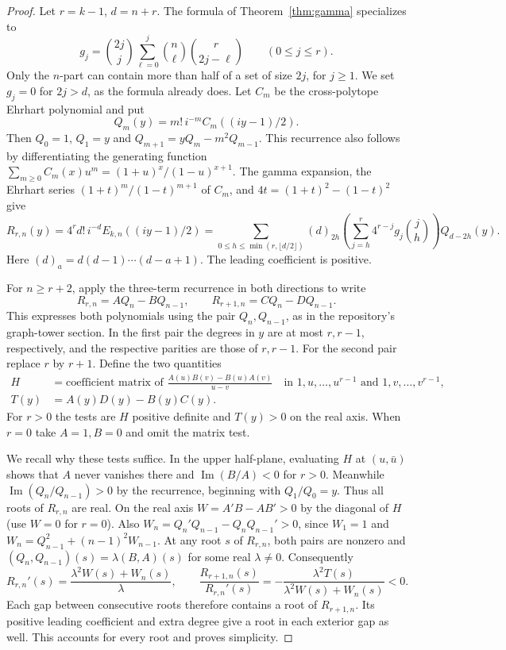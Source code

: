 \begin{proof}
Let $r=k-1$, $d=n+r$. The formula of Theorem~\ref{thm:gamma}
specializes to
\[
 g_j=\binom{2j}{j}\sum_{\ell=0}^j
           \binom n\ell\binom r{2j-\ell}\qquad (0\le j\le r).
\]
Only the $n$-part can contain more than half of a set of size $2j$,
for $j\ge1$. We set $g_j=0$ for $2j>d$, as the formula already does.
Let $C_m$ be the cross-polytope Ehrhart polynomial and put
\[
 Q_m(y)=m!\,i^{-m}C_m((iy-1)/2).
\]
Then $Q_0=1$, $Q_1=y$ and
$Q_{m+1}=yQ_m-m^2Q_{m-1}$. This recurrence also follows by
differentiating the generating function
$\sum_{m\ge0}C_m(x)u^m=(1+u)^x/(1-u)^{x+1}$.
The gamma expansion, the Ehrhart series
$(1+t)^m/(1-t)^{m+1}$ of $C_m$, and
$4t=(1+t)^2-(1-t)^2$ give
\[
 R_{r,n}(y)=4^r d!\,i^{-d}E_{k,n}((iy-1)/2)
       =\sum_{0\le h\le\min(r,\lfloor d/2\rfloor)}
           (d)_{2h}\left(\sum_{j=h}^r 4^{r-j}g_j\binom jh\right)Q_{d-2h}(y).
\]
Here $(d)_a=d(d-1)\cdots(d-a+1)$. The leading coefficient is positive.

For $n\ge r+2$, apply the three-term recurrence in both directions to
write
\[
 R_{r,n}=A Q_n-B Q_{n-1},\qquad R_{r+1,n}=C Q_n-D Q_{n-1}.
\]
This expresses both polynomials using the pair $Q_n,Q_{n-1}$, as in the
repository's graph-tower section. In the first pair the degrees in $y$ are
at most $r,r-1$, respectively, and the respective parities are those of
$r,r-1$. For the second pair replace $r$ by $r+1$.
Define the two quantities
\begin{align*}
 H&=\text{coefficient matrix of }
      \frac{A(u)B(v)-B(u)A(v)}{u-v}
      \quad\text{in }1,u,\ldots,u^{r-1}\text{ and }1,v,\ldots,v^{r-1},\\
 T(y)&=A(y)D(y)-B(y)C(y).
\end{align*}
For $r>0$ the tests are $H$ positive definite and $T(y)>0$ on the real
axis. When $r=0$ take $A=1,B=0$ and omit the matrix test.

We recall why these tests suffice. In the upper half-plane, evaluating
$H$ at $(u,\bar u)$ shows that $A$ never vanishes there and
$\operatorname{Im}(B/A)<0$ for $r>0$. Meanwhile
$\operatorname{Im}(Q_n/Q_{n-1})>0$ by the recurrence, beginning with
$Q_1/Q_0=y$. Thus all roots of $R_{r,n}$ are real. On the real axis
$W=A'B-AB'>0$ by the diagonal of $H$ (use $W=0$ for $r=0$).
Also $W_n=Q_n'Q_{n-1}-Q_nQ_{n-1}'>0$, since
$W_1=1$ and $W_n=Q_{n-1}^2+(n-1)^2W_{n-1}$.
At any root $s$ of $R_{r,n}$, both pairs are nonzero and
$(Q_n,Q_{n-1})(s)=\lambda (B,A)(s)$ for some real $\lambda\ne0$.
Consequently
\[
 R_{r,n}'(s)=\frac{\lambda^2 W(s)+W_n(s)}{\lambda},\qquad
 \frac{R_{r+1,n}(s)}{R_{r,n}'(s)}
   =-\frac{\lambda^2 T(s)}{\lambda^2 W(s)+W_n(s)}<0.
\]
Each gap between consecutive roots therefore contains a root of
$R_{r+1,n}$. Its positive leading coefficient and extra degree give a
root in each exterior gap as well. This accounts for every root and proves
simplicity.


\end{proof}
